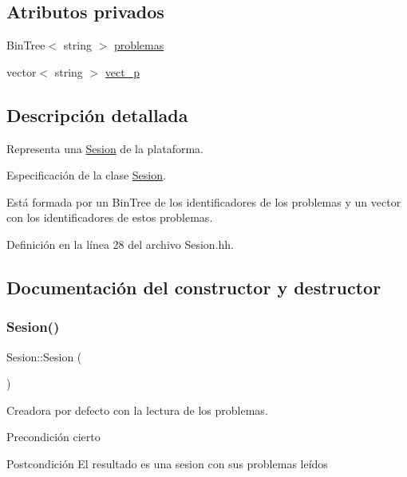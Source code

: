 \subsection*{Atributos privados}
\begin{DoxyCompactItemize}
\item 
Bin\+Tree$<$ string $>$ \mbox{\hyperlink{class_sesion_a7125fb9a733e06305e8e8889926b8d1b}{problemas}}
\item 
vector$<$ string $>$ \mbox{\hyperlink{class_sesion_ab9459a157fdb5e1c2f975ba20305ae8f}{vect\+\_\+p}}
\end{DoxyCompactItemize}


\subsection{Descripción detallada}
Representa una \mbox{\hyperlink{class_sesion}{Sesion}} de la plataforma. 

Especificación de la clase \mbox{\hyperlink{class_sesion}{Sesion}}.

Está formada por un Bin\+Tree de los identificadores de los problemas y un vector con los identificadores de estos problemas. 

Definición en la línea 28 del archivo Sesion.\+hh.



\subsection{Documentación del constructor y destructor}
\mbox{\label{class_sesion_adf5a84efa8e2629b30ad89df74cfc0a2}} 
\subsubsection{\texorpdfstring{Sesion()}{Sesion()}}
{\footnotesize\ttfamily Sesion\+::\+Sesion (\begin{DoxyParamCaption}{ }\end{DoxyParamCaption})}



Creadora por defecto con la lectura de los problemas. 

\begin{DoxyPrecond}{Precondición}
cierto 
\end{DoxyPrecond}
\begin{DoxyPostcond}{Postcondición}
El resultado es una sesion con sus problemas leídos 
\end{DoxyPostcond}


